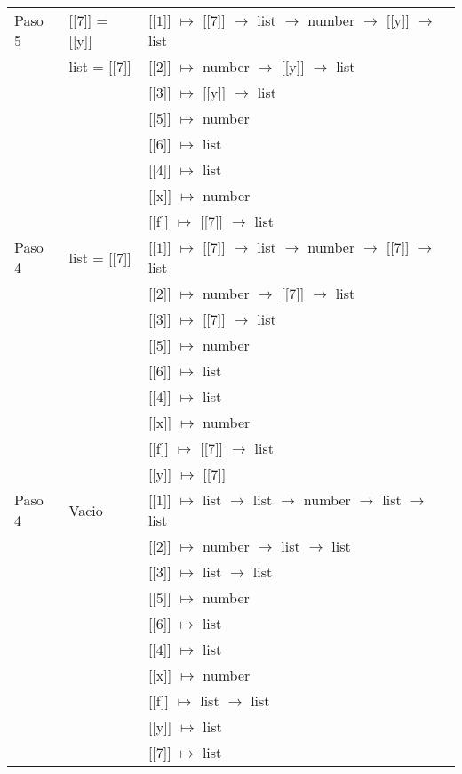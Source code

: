 \documentclass{article}
\begin{document}
\begin{center}
\begin{longtable}{ | l | p{10 cm} | p{5 cm} | }
 Paso 5  & [[$\boxed{7}$]] = [[y]] & [[$\boxed{1}$]] $\mapsto$ [[$\boxed{7}$]] $\rightarrow$ list $\rightarrow$ number $\rightarrow$ [[y]] $\rightarrow$ list \\
	 & list = [[$\boxed{7}$]] & [[$\boxed{2}$]] $\mapsto$ number $\rightarrow$ [[y]] $\rightarrow$ list \\
	 &	& [[$\boxed{3}$]] $\mapsto$ [[y]] $\rightarrow$ list \\
	 &	& [[$\boxed{5}$]] $\mapsto$ number \\
	 &	& [[$\boxed{6}$]] $\mapsto$ list \\ 
	 &	& [[$\boxed{4}$]] $\mapsto$ list \\ 
	 &	& [[x]] $\mapsto$ number \\ 
	 &	& [[f]] $\mapsto$ [[$\boxed{7}$]] $\rightarrow$ list \\ \hline
 
 Paso 4  & list = [[$\boxed{7}$]] & [[$\boxed{1}$]] $\mapsto$ [[$\boxed{7}$]] $\rightarrow$ list $\rightarrow$ number $\rightarrow$ [[$\boxed{7}$]] $\rightarrow$ list \\
	 &	& [[$\boxed{2}$]] $\mapsto$ number $\rightarrow$ [[$\boxed{7}$]] $\rightarrow$ list \\
	 &	& [[$\boxed{3}$]] $\mapsto$ [[$\boxed{7}$]] $\rightarrow$ list \\
	 &	& [[$\boxed{5}$]] $\mapsto$ number \\
	 &	& [[$\boxed{6}$]] $\mapsto$ list \\ 
	 &	& [[$\boxed{4}$]] $\mapsto$ list \\ 
	 &	& [[x]] $\mapsto$ number \\ 
	 &	& [[f]] $\mapsto$ [[$\boxed{7}$]] $\rightarrow$ list \\ 
	 &	& [[y]] $\mapsto$ [[$\boxed{7}$]] \\ \hline
	 
 Paso 4  &Vacio & [[$\boxed{1}$]] $\mapsto$ list $\rightarrow$ list $\rightarrow$ number $\rightarrow$ list $\rightarrow$ list \\
	 &	& [[$\boxed{2}$]] $\mapsto$ number $\rightarrow$ list $\rightarrow$ list \\
	 &	& [[$\boxed{3}$]] $\mapsto$ list $\rightarrow$ list \\
	 &	& [[$\boxed{5}$]] $\mapsto$ number \\
	 &	& [[$\boxed{6}$]] $\mapsto$ list \\ 
	 &	& [[$\boxed{4}$]] $\mapsto$ list \\ 
	 &	& [[x]] $\mapsto$ number \\ 
	 &	& [[f]] $\mapsto$ list $\rightarrow$ list \\ 
	 &	& [[y]] $\mapsto$ list \\ 
	 &	& [[$\boxed{7}$]] $\mapsto$ list \\ \hline

   \end{longtable}

\end{center}
\end{document}
